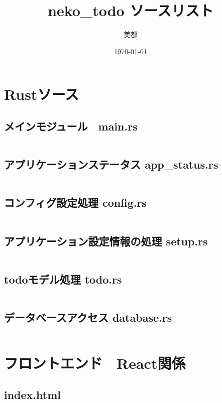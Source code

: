 \documentclass[paper=a4paper, fontsize=10pt, head_space=10mm, foot_space=17mm, gutter=17mm, line_length=185mm, twoside]{jlreq}
\title{neko\_todo ソースリスト}
\author{美都}
\date{\today}
\begin{document}
\maketitle
\tableofcontents
\clearpage

\section{Rustソース}
\subsection{メインモジュール　main.rs}
\inputminted[linenos, breaklines]{rust}{src-rs/main.rs}
\clearpage

\subsection{アプリケーションステータス app\_status.rs}
\inputminted[linenos, breaklines]{rust}{src-rs/app_status.rs}
\clearpage

\subsection{コンフィグ設定処理 config.rs}
\inputminted[linenos, breaklines]{rust}{src-rs/config.rs}
\clearpage

\subsection{アプリケーション設定情報の処理 setup.rs}
\inputminted[linenos, breaklines]{rust}{src-rs/setup.rs}
\clearpage

\subsection{todoモデル処理 todo.rs}
\inputminted[linenos, breaklines]{rust}{src-rs/todo.rs}
\clearpage

\subsection{データベースアクセス database.rs}
\inputminted[linenos, breaklines]{rust}{src-rs/database.rs}
\clearpage

\section {フロントエンド　React関係}
\subsection {index.html}
\inputminted[linenos, breaklines]{html}{index.html}
\clearpage
\end{document}

